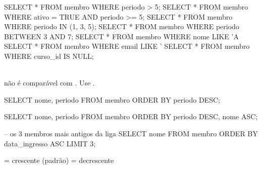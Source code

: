 \begin{frame}[fragile]{}
  \vspace{0.5em}
  \begin{sql}
SELECT * FROM membro WHERE periodo > 5;
SELECT * FROM membro WHERE ativo = TRUE AND periodo >= 5;
SELECT * FROM membro WHERE periodo IN (1, 3, 5);
SELECT * FROM membro WHERE periodo BETWEEN 3 AND 7;
SELECT * FROM membro WHERE nome LIKE 'A%
SELECT * FROM membro WHERE email LIKE '%
SELECT * FROM membro WHERE curso_id IS NULL;
  \end{sql}

  \vspace{0.8em}
  \begin{center}
    \\
    {\small {} não é comparável com \cd{=}. Use .}
  \end{center}

\end{frame}

\begin{frame}[fragile]{}
  \vspace{1em}
  \begin{sql}
SELECT nome, periodo FROM membro ORDER BY periodo DESC;

SELECT nome, periodo FROM membro
ORDER BY periodo DESC, nome ASC;

-- os 3 membros mais antigos da liga
SELECT nome FROM membro ORDER BY data_ingresso ASC LIMIT 3;
  \end{sql}

  \vspace{1.2em}
  \begin{center}
     = crescente (padrão) \qquad {} = decrescente
  \end{center}

\end{frame}

